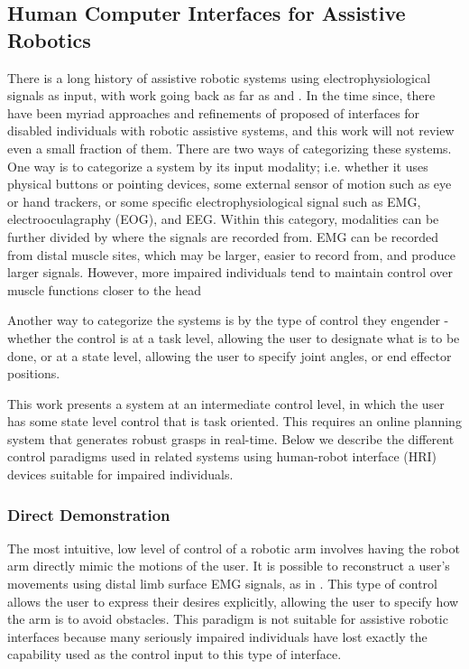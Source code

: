 
\subsection{Human Computer Interfaces for Assistive Robotics} 
There is a long history of assistive robotic systems using electrophysiological signals as input, with work going back as far as  \cite{schmidl-65} and \cite{sherman-65}. In the time since, there have been myriad approaches and refinements of proposed of interfaces for disabled individuals with robotic assistive systems, and this work will not review even a small fraction of them. There are two ways of categorizing these systems. One way is to categorize a system by its input modality; i.e. whether it uses physical buttons or pointing devices, some external sensor of motion such as eye or hand trackers, or some specific electrophysiological signal such as EMG, electrooculagraphy (EOG), and EEG.  Within this category, modalities can be further divided by where the signals are recorded from. EMG can be recorded from distal muscle sites, which may be larger, easier to record from, and produce larger signals. However, more impaired individuals tend to maintain control over muscle functions closer to the head

Another way to categorize the systems is by the type of control they engender - whether the control is at a task level, allowing the user to designate what is to be done, or at a state level, allowing the user to specify joint angles, or end effector positions.  

This work presents a system at an intermediate control level, in which the user has some state level control that is task oriented. This requires an online planning system that generates robust grasps in real-time. Below we describe the different control paradigms used in related systems using human-robot interface (HRI) devices suitable for impaired individuals.  

\subsubsection{Direct Demonstration}
 The most intuitive, low level of control of a robotic arm involves having the robot arm directly mimic the motions of the user. It is possible to reconstruct a user's movements using distal limb surface EMG signals, as in \cite{Artemiadis2011,Castellini2009}.  This type of control allows the user to express their desires explicitly, allowing the user to specify how the arm is to avoid obstacles. This paradigm is not suitable for assistive robotic interfaces because many seriously impaired individuals have lost exactly the capability used as the control input to this type of interface.  
 
